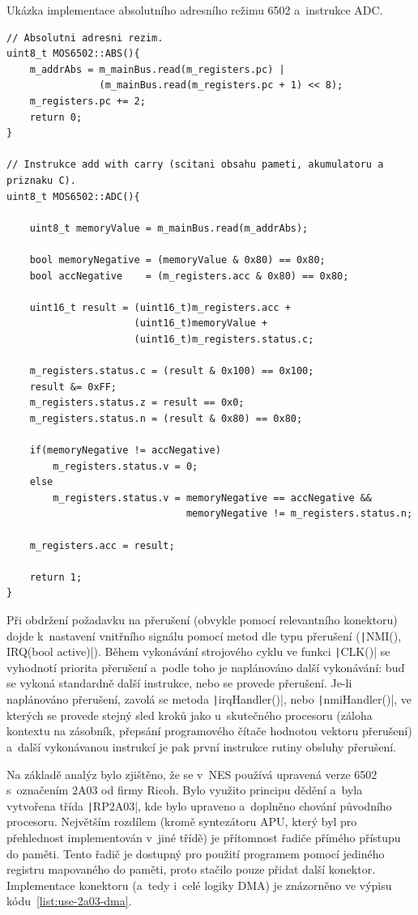 \begin{listing}
	\caption{Ukázka implementace absolutního adresního režimu 6502 a~instrukce ADC.}
	\label{list:use-6502-instrukce}
	\begin{verbatim}
// Absolutni adresni rezim.
uint8_t MOS6502::ABS(){
	m_addrAbs = m_mainBus.read(m_registers.pc) |
	            (m_mainBus.read(m_registers.pc + 1) << 8);
	m_registers.pc += 2;
	return 0;
}

// Instrukce add with carry (scitani obsahu pameti, akumulatoru a priznaku C).
uint8_t MOS6502::ADC(){
	
	uint8_t memoryValue = m_mainBus.read(m_addrAbs);
	
	bool memoryNegative = (memoryValue & 0x80) == 0x80;
	bool accNegative    = (m_registers.acc & 0x80) == 0x80;
	
	uint16_t result = (uint16_t)m_registers.acc +
	                  (uint16_t)memoryValue +
	                  (uint16_t)m_registers.status.c;

	m_registers.status.c = (result & 0x100) == 0x100;
	result &= 0xFF;
	m_registers.status.z = result == 0x0;
	m_registers.status.n = (result & 0x80) == 0x80;
	
	if(memoryNegative != accNegative)
		m_registers.status.v = 0;
	else
		m_registers.status.v = memoryNegative == accNegative && 
	                           memoryNegative != m_registers.status.n;
	
	m_registers.acc = result;
	
	return 1;
}
	\end{verbatim}
\end{listing}

Při obdržení požadavku na přerušení (obvykle pomocí relevantního konektoru) dojde k~nastavení vnitřního signálu pomocí metod dle typu přerušení (\texttt|NMI(), IRQ(bool active)|). Během vykonávání strojového cyklu ve funkci \texttt|CLK()| se vyhodnotí priorita přerušení a~podle toho je naplánováno další vykonávání: buď se vykoná standardně další instrukce, nebo se provede přerušení. Je-li naplánováno přerušení, zavolá se metoda \texttt|irqHandler()|, nebo \texttt|nmiHandler()|, ve kterých se provede stejný sled kroků jako u~skutečného procesoru (záloha kontextu na zásobník, přepsání programového čítače hodnotou vektoru přerušení) a~další vykonávanou instrukcí je pak první instrukce rutiny obsluhy přerušení.

Na základě analýz bylo zjištěno, že se v~NES používá upravená verze 6502 s~označením 2A03 od firmy Ricoh. Bylo využito principu dědění a~byla vytvořena třída \texttt|RP2A03|, kde bylo upraveno a~doplněno chování původního procesoru. Největším rozdílem (kromě syntezátoru APU, který byl pro přehlednost implementován v~jiné třídě) je přítomnost řadiče přímého přístupu do paměti. Tento řadič je dostupný pro použití programem pomocí jediného registru mapovaného do paměti, proto stačilo pouze přidat další konektor. Implementace konektoru (a~tedy i~celé logiky DMA) je znázorněno ve výpisu kódu~\ref{list:use-2a03-dma}.

